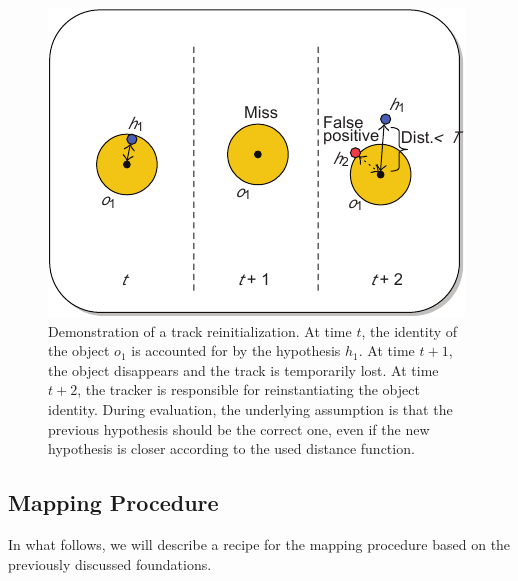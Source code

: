 \begin{figure}[t]
    \centerline{\includegraphics[width=0.5\linewidth]{figures/theoretical_foundations/object_hypothesis_reinit.pdf}}
    \caption[Object-hypothesis re-initialization]{Demonstration of a track reinitialization. At time $t$, the identity of the object $o_1$ is accounted for by the hypothesis $h_1$. At time $t + 1$, the object disappears and the track is temporarily lost. At time $t + 2$, the tracker is responsible for reinstantiating the object identity. During evaluation, the underlying assumption is that the previous hypothesis should be the correct one, even if the new hypothesis is closer according to the used distance function. }
    \label{fig:ObjectHypothesisReInit}
\end{figure}

\subsection{Mapping Procedure}

In what follows, we will describe a recipe for the mapping procedure based on the previously discussed foundations.

